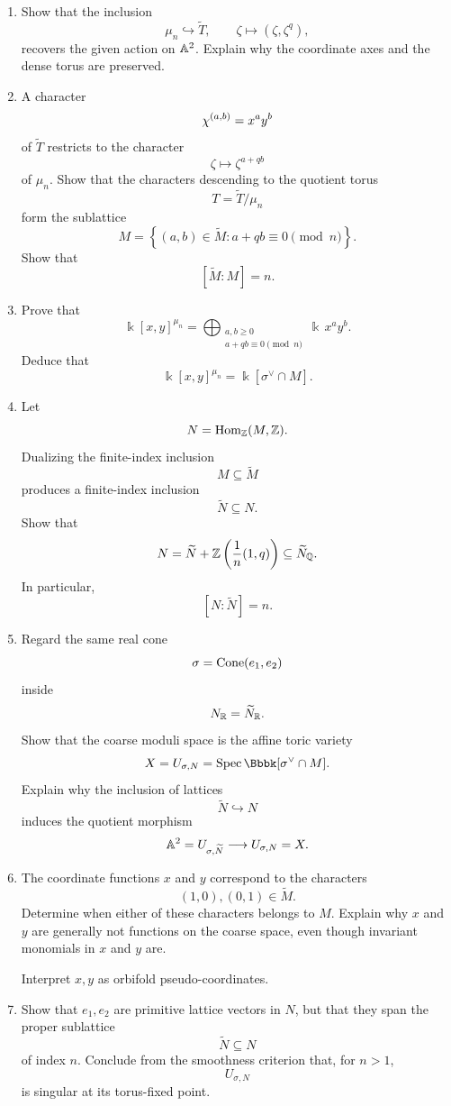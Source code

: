\begin{enumerate}[label=\textbf{Hint \arabic*.},wide=0pt]

\item Show that the inclusion
\[
\mu_n\hookrightarrow\widetilde T,
\qquad
\zeta\longmapsto(\zeta,\zeta^q),
\]
recovers the given action on \(\mathbb{A}^2\). Explain why the coordinate
axes and the dense torus are preserved.

\item A character
\[
\chi^{(a,b)}=x^ay^b
\]
of \(\widetilde T\) restricts to the character
\[
\zeta\longmapsto\zeta^{a+qb}
\]
of \(\mu_n\). Show that the characters descending to the quotient
torus
\[
T=\widetilde T/\mu_n
\]
form the sublattice
\[
M
=
\left\{
(a,b)\in\widetilde M:
a+qb\equiv0\pmod n
\right\}.
\]
Show that
\[
[\widetilde M:M]=n.
\]

\item Prove that
\[
\Bbbk[x,y]^{\mu_n}
=
\bigoplus_{\substack{a,b\geq0\\
a+qb\equiv0\!\!\!\pmod n}}
\Bbbk\,x^ay^b.
\]
Deduce that
\[
\Bbbk[x,y]^{\mu_n}
=
\Bbbk[\sigma^\vee\cap M].
\]

\item Let
\[
N=\operatorname{Hom}_{\mathbb{Z}}(M,\mathbb{Z}).
\]
Dualizing the finite-index inclusion
\[
M\subseteq\widetilde M
\]
produces a finite-index inclusion
\[
\widetilde N\subseteq N.
\]
Show that
\[
N
=
\widetilde N
+
\mathbb{Z}\left(\frac1n(1,q)\right)
\subseteq\widetilde N_{\mathbb{Q}}.
\]
In particular,
\[
[N:\widetilde N]=n.
\]

\item Regard the same real cone
\[
\sigma=\operatorname{Cone}(e_1,e_2)
\]
inside
\[
N_{\mathbb{R}}=\widetilde N_{\mathbb{R}}.
\]
Show that the coarse moduli space is the affine toric variety
\[
X=U_{\sigma,N}
=
\Spec\Bbbk[\sigma^\vee\cap M].
\]
Explain why the inclusion of lattices
\[
\widetilde N\hookrightarrow N
\]
induces the quotient morphism
\[
\mathbb{A}^2=U_{\sigma,\widetilde N}
\longrightarrow
U_{\sigma,N}=X.
\]

\item The coordinate functions \(x\) and \(y\) correspond to the
characters
\[
(1,0),(0,1)\in\widetilde M.
\]
Determine when either of these characters belongs to \(M\). Explain
why \(x\) and \(y\) are generally not functions on the coarse space,
even though invariant monomials in \(x\) and \(y\) are.

Interpret \(x,y\) as orbifold pseudo-coordinates.

\item Show that \(e_1,e_2\) are primitive lattice vectors in \(N\),
but that they span the proper sublattice
\[
\widetilde N\subseteq N
\]
of index \(n\). Conclude from the smoothness criterion that, for
\(n>1\),
\[
U_{\sigma,N}
\]
is singular at its torus-fixed point.


\end{enumerate}
